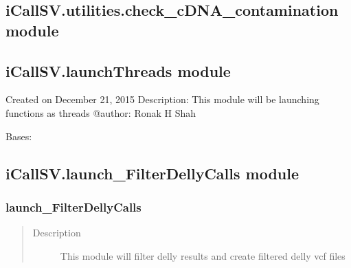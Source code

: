 \documentclass[letterpaper,10pt,english]{sphinxmanual}
\begin{document}
\subsection{iCallSV.utilities.check\_cDNA\_contamination module}
\label{iCallSV:icallsv-utilities-check-cdna-contamination-module}

\subsection{iCallSV.launchThreads module}
\label{iCallSV:icallsv-launchthreads-module}\label{iCallSV:module-iCallSV.launchThreads}
Created on December 21, 2015
Description: This module will be launching functions as threads
@author: Ronak H Shah

\begin{fulllineitems}
\label{iCallSV:iCallSV.launchThreads.myThread}
Bases: 

\begin{fulllineitems}
\label{iCallSV:iCallSV.launchThreads.myThread.run}
\end{fulllineitems}


\end{fulllineitems}


\begin{fulllineitems}
\label{iCallSV:iCallSV.launchThreads.print_time}
\end{fulllineitems}



\subsection{iCallSV.launch\_FilterDellyCalls module}
\label{iCallSV:module-iCallSV.launch_FilterDellyCalls}\label{iCallSV:icallsv-launch-filterdellycalls-module}

\subsubsection{launch\_FilterDellyCalls}
\label{iCallSV:launch-filterdellycalls}\begin{quote}\begin{description}
\item[{Description}] \leavevmode
This module will filter delly results and create filtered delly vcf files

\end{description}\end{quote}
\end{document}
